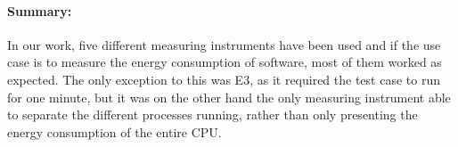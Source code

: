 \paragraph*{Summary:} In our work, five different measuring instruments have been used and if the use case is to measure the energy consumption of software, most of them worked as expected. The only exception to this was E3, as it required the test case to run for one minute, but it was on the other hand the only measuring instrument able to separate the different processes running, rather than only presenting the energy consumption of the entire CPU. 